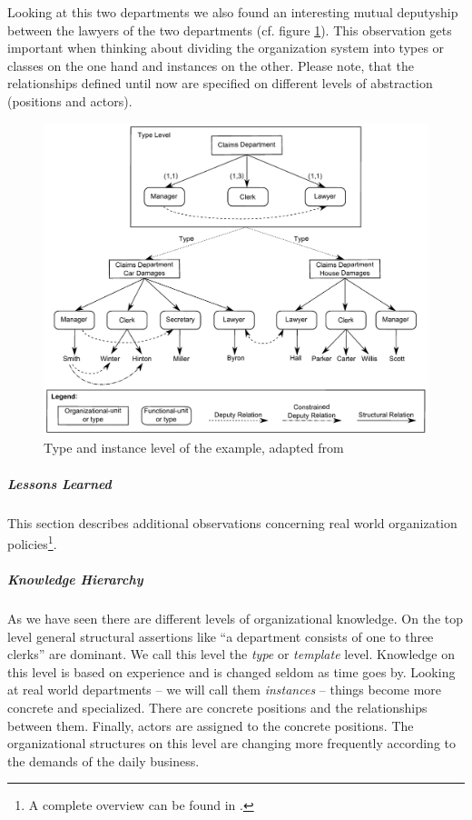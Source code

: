 Looking at this two departments we also found an interesting mutual deputyship between the lawyers of the two departments (cf. figure \ref{Example1}). This observation gets important when thinking about dividing the organization system into types or classes on the one hand and instances on the other. Please note, that the relationships defined until now are specified on different levels of abstraction (positions and actors).
	\begin{figure}[htb!]
	\centering
	\includegraphics[width=\textwidth]{Figures/alles.pdf}
	\caption{Type and instance level of the example, adapted from \cite[fig. 3]{Lawall2013}}
	\label{Example1}
	\end{figure}

\subparagraph{Lessons Learned}

This section describes additional observations concerning real world organization policies\footnote{A complete overview can be found in \cite{Schaller98}.}.

\subparagraph{Knowledge Hierarchy}
As we have seen there are different levels of organizational knowledge. On the top level general structural assertions like ``a department consists of one to three clerks'' are dominant. We call this level the \emph{type} or \emph{template} level. Knowledge on this level is based on experience and is changed seldom as time goes by. Looking at real world departments -- we will call them \emph{instances} -- things become more concrete and specialized. There are concrete positions and the relationships between them. Finally, actors are assigned to the concrete positions. The organizational structures on this level are changing more frequently according to the demands of the daily business.

